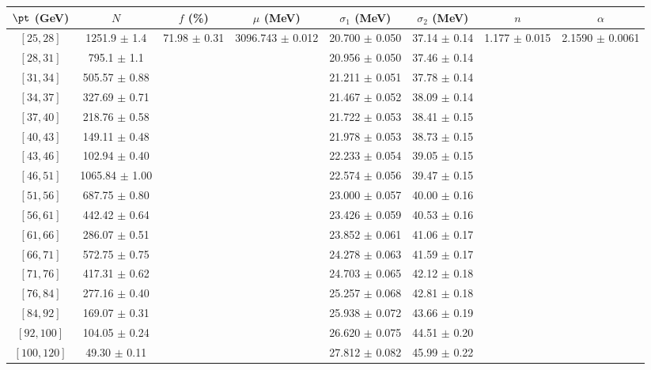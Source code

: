\begin{tabular}{c||c|c|c|c|c|c|c}
$\pt$ (GeV) & $N$ & $f$ (\%) & $\mu$ (MeV) & $\sigma_1$ (MeV) & $\sigma_2$ (MeV) & $n$ & $\alpha$ \\
\hline
$[25, 28]$ & 1251.9 $\pm$ 1.4 & \multirow{17}{*}{71.98 $\pm$ 0.31} & \multirow{17}{*}{3096.743 $\pm$ 0.012} & 20.700 $\pm$ 0.050 & 37.14 $\pm$ 0.14 & \multirow{17}{*}{1.177 $\pm$ 0.015} & \multirow{17}{*}{2.1590 $\pm$ 0.0061}\\
$[28, 31]$ & 795.1 $\pm$ 1.1 &  &  & 20.956 $\pm$ 0.050 & 37.46 $\pm$ 0.14 &  & \\
$[31, 34]$ & 505.57 $\pm$ 0.88 &  &  & 21.211 $\pm$ 0.051 & 37.78 $\pm$ 0.14 &  & \\
$[34, 37]$ & 327.69 $\pm$ 0.71 &  &  & 21.467 $\pm$ 0.052 & 38.09 $\pm$ 0.14 &  & \\
$[37, 40]$ & 218.76 $\pm$ 0.58 &  &  & 21.722 $\pm$ 0.053 & 38.41 $\pm$ 0.15 &  & \\
$[40, 43]$ & 149.11 $\pm$ 0.48 &  &  & 21.978 $\pm$ 0.053 & 38.73 $\pm$ 0.15 &  & \\
$[43, 46]$ & 102.94 $\pm$ 0.40 &  &  & 22.233 $\pm$ 0.054 & 39.05 $\pm$ 0.15 &  & \\
$[46, 51]$ & 1065.84 $\pm$ 1.00 &  &  & 22.574 $\pm$ 0.056 & 39.47 $\pm$ 0.15 &  & \\
$[51, 56]$ & 687.75 $\pm$ 0.80 &  &  & 23.000 $\pm$ 0.057 & 40.00 $\pm$ 0.16 &  & \\
$[56, 61]$ & 442.42 $\pm$ 0.64 &  &  & 23.426 $\pm$ 0.059 & 40.53 $\pm$ 0.16 &  & \\
$[61, 66]$ & 286.07 $\pm$ 0.51 &  &  & 23.852 $\pm$ 0.061 & 41.06 $\pm$ 0.17 &  & \\
$[66, 71]$ & 572.75 $\pm$ 0.75 &  &  & 24.278 $\pm$ 0.063 & 41.59 $\pm$ 0.17 &  & \\
$[71, 76]$ & 417.31 $\pm$ 0.62 &  &  & 24.703 $\pm$ 0.065 & 42.12 $\pm$ 0.18 &  & \\
$[76, 84]$ & 277.16 $\pm$ 0.40 &  &  & 25.257 $\pm$ 0.068 & 42.81 $\pm$ 0.18 &  & \\
$[84, 92]$ & 169.07 $\pm$ 0.31 &  &  & 25.938 $\pm$ 0.072 & 43.66 $\pm$ 0.19 &  & \\
$[92, 100]$ & 104.05 $\pm$ 0.24 &  &  & 26.620 $\pm$ 0.075 & 44.51 $\pm$ 0.20 &  & \\
$[100, 120]$ & 49.30 $\pm$ 0.11 &  &  & 27.812 $\pm$ 0.082 & 45.99 $\pm$ 0.22 &  & \\
\end{tabular}
